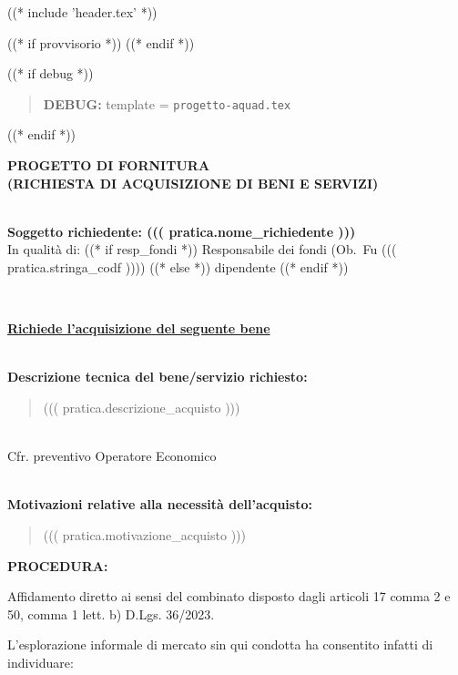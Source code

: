 
((* include 'header.tex' *))

((* if provvisorio *))
((* endif *))


\topaddr

((* if debug *))
\begin{quotation}
	\textbf{DEBUG:} template = \texttt{progetto-aquad.tex}
\end{quotation}
((* endif *))

\begin{center}
\textbf{PROGETTO DI FORNITURA \\ (RICHIESTA DI ACQUISIZIONE DI BENI E SERVIZI)}
\end{center}

~\\
\textbf{Soggetto richiedente: ((( pratica.nome_richiedente )))} \\

In qualità di:          %
((* if resp_fondi *)) Responsabile dei fondi (Ob.~Fu ((( pratica.stringa_codf ))))
((* else *)) dipendente
((* endif *))

~\\
\begin{center}
\textbf{\underline{Richiede l'acquisizione del seguente bene}}
\end{center}

~\\
\textbf{Descrizione tecnica del bene/servizio richiesto:}
\begin{quote}
((( pratica.descrizione_acquisto )))
\end{quote}

~\\
Cfr. preventivo Operatore Economico 

~\\
\textbf{Motivazioni relative alla necessità dell’acquisto: }
\begin{quote}
((( pratica.motivazione_acquisto )))
\end{quote}


\textbf{PROCEDURA: } %

Affidamento diretto ai sensi del combinato disposto dagli articoli 17 comma 2 e 50, comma 1 lett. b) D.Lgs. 36/2023.

L’esplorazione informale di mercato sin qui condotta ha consentito infatti di individuare:

